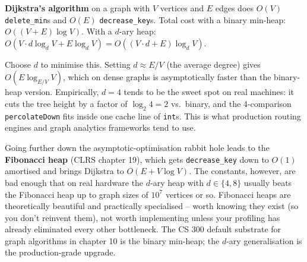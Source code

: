 \documentclass[11pt]{article}
\begin{document}
\textbf{Dijkstra's algorithm} on a graph with $V$ vertices and $E$
edges does $O(V)$ \texttt{delete\_min}s and $O(E)$
\texttt{decrease\_key}s. Total cost with a binary min-heap:
$O((V + E) \log V)$. With a $d$-ary heap:
$O(V \cdot d \log_d V + E \log_d V) = O((V \cdot d + E) \log_d V)$.

Choose $d$ to minimise this. Setting $d \approx E/V$ (the average
degree) gives $O(E \log_{E/V} V)$, which on dense graphs is
asymptotically faster than the binary-heap version. Empirically,
$d = 4$ tends to be the sweet spot on real machines: it cuts the tree
height by a factor of $\log_2 4 = 2$ vs.\ binary, and the
4-comparison \texttt{percolateDown} fits inside one cache line of
\texttt{int}s. This is what production routing engines and graph
analytics frameworks tend to use.

\begin{notebox}
Going further down the asymptotic-optimisation rabbit hole leads to
the \textbf{Fibonacci heap} (CLRS chapter 19), which gets
\texttt{decrease\_key} down to $O(1)$ amortised and brings Dijkstra
to $O(E + V \log V)$. The constants, however, are bad enough that on
real hardware the $d$-ary heap with $d \in \{4, 8\}$ usually beats
the Fibonacci heap up to graph sizes of $10^7$ vertices or so.
Fibonacci heaps are theoretically beautiful and practically
specialised -- worth knowing they exist (so you don't reinvent them),
not worth implementing unless your profiling has already eliminated
every other bottleneck. The CS 300 default substrate for graph
algorithms in chapter 10 is the binary min-heap; the $d$-ary
generalisation is the production-grade upgrade.
\end{notebox}
\end{document}
